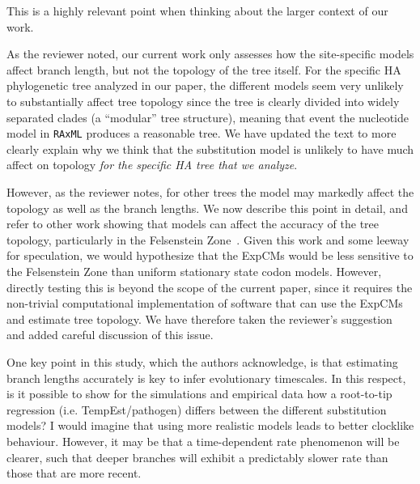 \documentclass[11pt, oneside]{article}   	%
\newcommand{\response}[1]{{\color{black}#1}}
\begin{document}
\response{This is a highly relevant point when thinking about the larger context of our work. 

As the reviewer noted, our current work only assesses how the site-specific models affect branch length, but not the topology of the tree itself. 
For the specific HA phylogenetic tree analyzed in our paper, the different models seem very unlikely to substantially affect tree topology since the tree is clearly divided into widely separated clades (a ``modular'' tree structure), meaning that event the nucleotide model in \texttt{RAxML} produces a reasonable tree. 
We have updated the text to more clearly explain why we think that the substitution model is unlikely to have much affect on topology \emph{for the specific HA tree that we analyze}. 

However, as the reviewer notes, for other trees the model may markedly affect the topology as well as the branch lengths.
We now describe this point in detail, and refer to other work showing that models can affect the accuracy of the tree topology, particularly in the Felsenstein Zone~\citep{lartillot2007suppression}. 
Given this work and some leeway for speculation, we would hypothesize that the ExpCMs would be less sensitive to the Felsenstein Zone than uniform stationary state codon models.
However, directly testing this is beyond the scope of the current paper, since it requires the non-trivial computational implementation of software that can use the ExpCMs and estimate tree topology.
We have therefore taken the reviewer's suggestion and added careful discussion of this issue.
}

One key point in this study, which the authors acknowledge, is that estimating branch lengths accurately is key to infer evolutionary timescales. 
In this respect, is it possible to show for the simulations and empirical data how a root-to-tip regression (i.e. TempEst/pathogen) differs between the different substitution models? 
I would imagine that using more realistic models leads to better clocklike behaviour. 
However, it may be that a time-dependent rate phenomenon will be clearer, such that deeper branches will exhibit a predictably slower rate than those that are more recent. 
\end{document}
